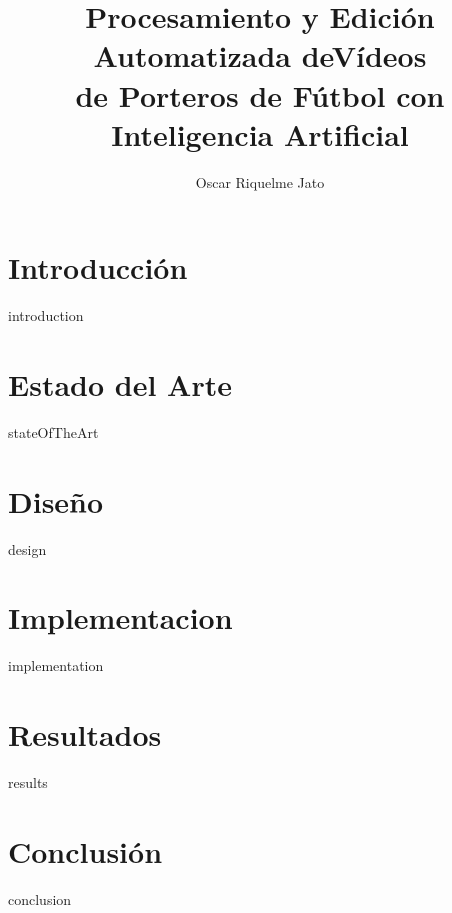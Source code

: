 \documentclass[epsbased,final,covers]{tfgtfmthesisuam}
\title[Visión computacional aplicada al deporte]{Procesamiento y Edición Automatizada deVídeos\\ de Porteros de Fútbol con Inteligencia Artificial}
\author{Oscar Riquelme Jato}
\begin{document}

\chapter[Introducción]{Introducción}{introduction}
\chapter[Estado del Arte]{Estado del Arte}{stateOfTheArt}
\chapter[Diseño]{Diseño}{design}
\chapter[Implementación]{Implementacion}{implementation}
\chapter[Resultados]{Resultados}{results}
\chapter[Conclusión]{Conclusión}{conclusion}

\end{document}
